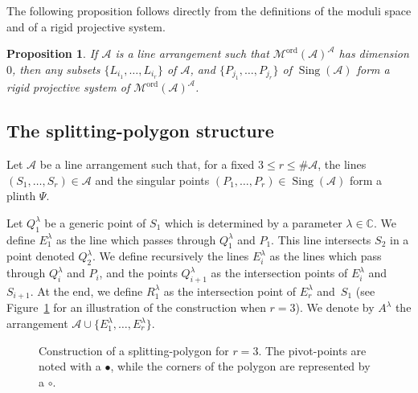 \documentclass[11pt, a4paper]{amsart}
\newtheorem{proposition}[theorem]{Proposition}
\theoremstyle{definition}
\theoremstyle{remark}
\newcommand{\CC}{\mathds{C}}
\newcommand{\A}{\mathcal{A}}
\newcommand{\M}{\mathcal{M}}
\newcommand{\ord}{\text{ord}}
\DeclareMathOperator{\sing}{Sing}
\renewcommand{\line}[5]{ 
	\draw ($ #1 - 1/100*#3*#2 + 1/100*#3*#1 $)  -- ($ #2 + 1/100*#4*#2 - 1/100*#4*#1 $);
	\node at ($ #1 - 1.3/100*#3*#2 + 1.3/100*#3*#1 $)  {#5};
}
\begin{document}
The following proposition follows directly from the definitions of the moduli space and of a rigid projective system.

\begin{proposition}\label{propo:rigidity}
	If $\A$ is a line arrangement such that $\M^\ord(\A)^\A$ has dimension $0$, then any subsets $\{L_{i_1},\dots,L_{i_r}\}$ of $\A$, and $\{P_{j_1},\dots,P_{j_r}\}$ of $\sing(\A)$ form a rigid projective system of $\M^\ord(\A)^\A$.
\end{proposition}


\subsection{The splitting-polygon structure}\label{sec:construction}\mbox{}

Let $\A$ be a line arrangement such that, for a fixed $3 \leq r\leq \# \A$, the lines $(S_1,\dots,S_r)\in\A$ and the singular points $(P_1,\dots,P_r)\in\sing(\A)$ form a plinth $\Psi$.  

Let $Q^\lambda_1$ be a generic point of $S_1$ which is determined by a parameter $\lambda\in\CC$. We define $E^\lambda_1$ as the line which passes through $Q^\lambda_1$ and $P_1$. This line intersects $S_2$ in a point denoted $Q^\lambda_2$. We define recursively the lines $E^\lambda_i$ as the lines which pass through $Q^\lambda_i$ and $P_i$, and the points $Q^\lambda_{i+1}$ as the intersection points of $E^\lambda_i$ and $S_{i+1}$. At the end, we define $R^\lambda_1$ as the intersection point of $E^\lambda_r$ and~$S_1$ (see Figure~\ref{fig:SP} for an illustration of the construction when $r=3$). We denote by $A^\lambda$ the arrangement $\A \cup \{E^\lambda_1,\dots,E^\lambda_r\}$.

\begin{figure}[h!]
	\caption{Construction of a splitting-polygon for $r=3$. The pivot-points are noted with a $\bullet$, while the corners of the polygon are represented by a $\circ$.  \label{fig:SP}}
\end{figure}
\end{document}
